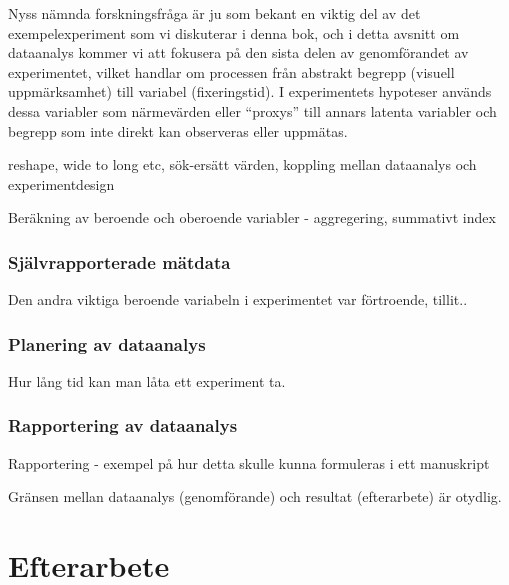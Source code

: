 \documentclass[
]{book}
\begin{document}
Nyss nämnda forskningsfråga är ju som bekant en viktig del av det exempelexperiment som vi diskuterar i denna bok, och i detta avsnitt om dataanalys kommer vi att fokusera på den sista delen av genomförandet av experimentet, vilket handlar om processen från abstrakt begrepp (visuell uppmärksamhet) till variabel (fixeringstid). I experimentets hypoteser används dessa variabler som närmevärden eller ``proxys'' till annars latenta variabler och begrepp som inte direkt kan observeras eller uppmätas.

reshape, wide to long etc, sök-ersätt värden, koppling mellan dataanalys och experimentdesign

Beräkning av beroende och oberoende variabler - aggregering, summativt index

\hypertarget{sub07.7.2}{%
\subsection{Självrapporterade mätdata}\label{sub07.7.2}}

Den andra viktiga beroende variabeln i experimentet var förtroende, tillit..

\hypertarget{sub07.7.3}{%
\subsection{Planering av dataanalys}\label{sub07.7.3}}

Hur lång tid kan man låta ett experiment ta.

\hypertarget{sub07.7.4}{%
\subsection{Rapportering av dataanalys}\label{sub07.7.4}}

Rapportering - exempel på hur detta skulle kunna formuleras i ett manuskript

Gränsen mellan dataanalys (genomförande) och resultat (efterarbete) är otydlig.

\hypertarget{chap08}{%
\chapter{Efterarbete}\label{chap08}}
\end{document}
